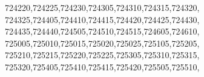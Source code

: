 \documentclass[
  12,
  dvipsnames]{article}
\newenvironment{Shaded}{\begin{snugshade}}{\end{snugshade}}
\newcommand{\NormalTok}[1]{#1}
\newcommand{\StringTok}[1]{\textcolor[rgb]{0.31,0.60,0.02}{#1}}
\begin{document}
\begin{Shaded}
\begin{Highlighting}[]
                  \StringTok{\textquotesingle{}724220\textquotesingle{}}\NormalTok{,}\StringTok{\textquotesingle{}724225\textquotesingle{}}\NormalTok{,}\StringTok{\textquotesingle{}724230\textquotesingle{}}\NormalTok{,}\StringTok{\textquotesingle{}724305\textquotesingle{}}\NormalTok{,}\StringTok{\textquotesingle{}724310\textquotesingle{}}\NormalTok{,}\StringTok{\textquotesingle{}724315\textquotesingle{}}\NormalTok{,}\StringTok{\textquotesingle{}724320\textquotesingle{}}\NormalTok{,}
                  \StringTok{\textquotesingle{}724325\textquotesingle{}}\NormalTok{,}\StringTok{\textquotesingle{}724405\textquotesingle{}}\NormalTok{,}\StringTok{\textquotesingle{}724410\textquotesingle{}}\NormalTok{,}\StringTok{\textquotesingle{}724415\textquotesingle{}}\NormalTok{,}\StringTok{\textquotesingle{}724420\textquotesingle{}}\NormalTok{,}\StringTok{\textquotesingle{}724425\textquotesingle{}}\NormalTok{,}\StringTok{\textquotesingle{}724430\textquotesingle{}}\NormalTok{,}
                  \StringTok{\textquotesingle{}724435\textquotesingle{}}\NormalTok{,}\StringTok{\textquotesingle{}724440\textquotesingle{}}\NormalTok{,}\StringTok{\textquotesingle{}724505\textquotesingle{}}\NormalTok{,}\StringTok{\textquotesingle{}724510\textquotesingle{}}\NormalTok{,}\StringTok{\textquotesingle{}724515\textquotesingle{}}\NormalTok{,}\StringTok{\textquotesingle{}724605\textquotesingle{}}\NormalTok{,}\StringTok{\textquotesingle{}724610\textquotesingle{}}\NormalTok{,}
                  \StringTok{\textquotesingle{}725005\textquotesingle{}}\NormalTok{,}\StringTok{\textquotesingle{}725010\textquotesingle{}}\NormalTok{,}\StringTok{\textquotesingle{}725015\textquotesingle{}}\NormalTok{,}\StringTok{\textquotesingle{}725020\textquotesingle{}}\NormalTok{,}\StringTok{\textquotesingle{}725025\textquotesingle{}}\NormalTok{,}\StringTok{\textquotesingle{}725105\textquotesingle{}}\NormalTok{,}\StringTok{\textquotesingle{}725205\textquotesingle{}}\NormalTok{,}
                  \StringTok{\textquotesingle{}725210\textquotesingle{}}\NormalTok{,}\StringTok{\textquotesingle{}725215\textquotesingle{}}\NormalTok{,}\StringTok{\textquotesingle{}725220\textquotesingle{}}\NormalTok{,}\StringTok{\textquotesingle{}725225\textquotesingle{}}\NormalTok{,}\StringTok{\textquotesingle{}725305\textquotesingle{}}\NormalTok{,}\StringTok{\textquotesingle{}725310\textquotesingle{}}\NormalTok{,}\StringTok{\textquotesingle{}725315\textquotesingle{}}\NormalTok{,}
                  \StringTok{\textquotesingle{}725320\textquotesingle{}}\NormalTok{,}\StringTok{\textquotesingle{}725405\textquotesingle{}}\NormalTok{,}\StringTok{\textquotesingle{}725410\textquotesingle{}}\NormalTok{,}\StringTok{\textquotesingle{}725415\textquotesingle{}}\NormalTok{,}\StringTok{\textquotesingle{}725420\textquotesingle{}}\NormalTok{,}\StringTok{\textquotesingle{}725505\textquotesingle{}}\NormalTok{,}\StringTok{\textquotesingle{}725510\textquotesingle{}}\NormalTok{,}

\end{Highlighting}
\end{Shaded}
\end{document}
